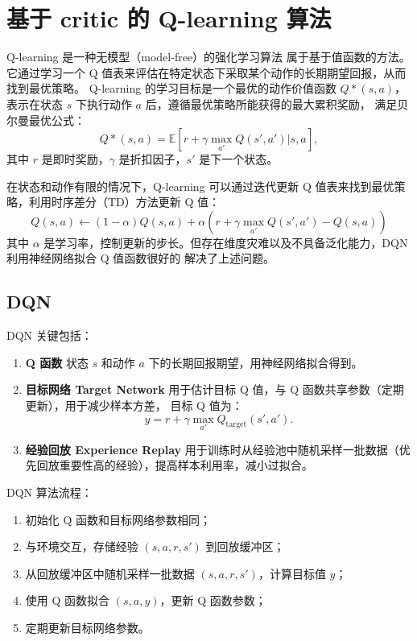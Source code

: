 \section{基于 critic 的 Q-learning 算法}
Q-learning 是一种无模型（model-free）的强化学习算法
属于基于值函数的方法。它通过学习一个 Q 值表来评估在特定状态下采取某个动作的长期期望回报，从而找到最优策略。
Q-learning 的学习目标是一个最优的动作价值函数 $Q*(s, a)$，表示在状态 $s$ 下执行动作 $a$ 后，遵循最优策略所能获得的最大累积奖励，
满足贝尔曼最优公式：
\begin{equation}
    Q*(s, a) = \mathbb{E} [r + \gamma \max_{a'} Q(s', a')|s,a],
\end{equation}
其中 $r$ 是即时奖励，$\gamma$ 是折扣因子，$s'$ 是下一个状态。

在状态和动作有限的情况下，Q-learning 可以通过迭代更新 Q 值表来找到最优策略，利用时序差分（TD）方法更新 Q 值：
\begin{equation}
    Q(s, a) \leftarrow (1-\alpha) Q(s, a) + \alpha (r + \gamma \max_{a'} Q(s', a')-Q(s, a))
\end{equation}
其中 $\alpha$ 是学习率，控制更新的步长。但存在维度灾难以及不具备泛化能力，DQN 利用神经网络拟合 Q 值函数很好的
解决了上述问题。

\subsection{DQN}
DQN 关键包括：
\begin{enumerate}
    \item \textbf{Q 函数} 状态 $s$ 和动作 $a$ 下的长期回报期望，用神经网络拟合得到。
    \item \textbf{目标网络 Target Network} 用于估计目标 Q 值，与 Q 函数共享参数（定期更新），用于减少样本方差，
    目标 Q 值为：
    \begin{equation}
        y = r + \gamma \max_{a'} Q_{\text{target}}(s', a').
    \end{equation}
    \item \textbf{经验回放 Experience Replay} 用于训练时从经验池中随机采样一批数据（优先回放重要性高的经验），提高样本利用率，减小过拟合。
\end{enumerate}

DQN 算法流程：
\begin{enumerate}
    \item 初始化 Q 函数和目标网络参数相同；
    \item 与环境交互，存储经验 $(s,a,r,s')$ 到回放缓冲区；
    \item 从回放缓冲区中随机采样一批数据 $(s,a,r,s')$，计算目标值 $y$；
    \item 使用 Q 函数拟合 $(s,a,y)$，更新 Q 函数参数；
    \item 定期更新目标网络参数。
\end{enumerate}

